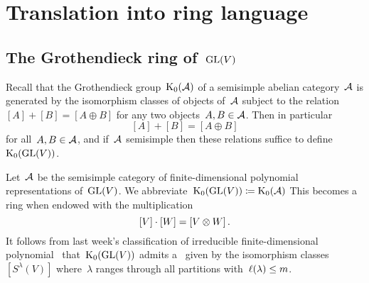 \documentclass[a4paper,10pt]{scrartcl}
\begin{document}





\section{Translation into ring language}



\subsection{The Grothendieck ring of~$\operatorname{GL}(V)$}

Recall that the Grothendieck group~$\operatorname{K}_0(\mathcal{A})$ of a semisimple abelian category~$\mathcal{A}$ is generated by the isomorphism classes of objects of~$\mathcal{A}$ subject to the relation~$[A] + [B] = [A \oplus B]$ for any two objects~$A, B \in \mathcal{A}$.
Then in particular
\begin{equation}
  \label{additivity in grothendieck group}
  [A] + [B] = [A \oplus B]
\end{equation}
for all~$A, B \in \mathcal{A}$, and if~$\mathcal{A}$ semisimple then these relations suffice to define~$\operatorname{K}_0(\operatorname{GL}(V))$.

Let~$\mathcal{A}$ be the semisimple category of finite-dimensional polynomial representations of~$\operatorname{GL}(V)$.
We abbreviate~$\operatorname{K}_0(\operatorname{GL}(V)) \coloneqq \operatorname{K}_0(\mathcal{A})$
This becomes a ring when endowed with the multiplication
\[
  [V] \cdot [W]
  =
  [V \otimes W] \,.
\]
It follows from last week’s classification of irreducible finite-dimensional polynomial~{} that~$\operatorname{K}_0(\operatorname{GL}(V))$ admits a~{\basis{$\Integer$}} given by the isomorphism classes~$[S^\lambda(V)]$ where~$\lambda$ ranges through all partitions with~$\operatorname{\ell}(\lambda) \leq m$.
\end{document}
